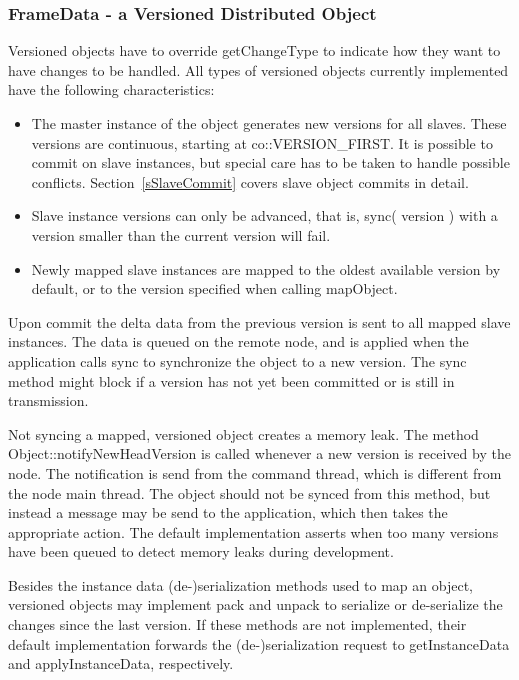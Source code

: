 \documentclass[10pt,a4]{scrartcl}
\newcommand{\sref}[1]{Section~\ref{#1}}
\begin{document}
\subsubsection{FrameData - a Versioned Distributed Object}

Versioned objects have to override \textsf{getChangeType} to indicate
how they want to have changes to be handled. All types of versioned
objects currently implemented have the following characteristics:

\begin{itemize}
\item The master instance of the object generates new versions for all
  slaves. These versions are continuous, starting at
  \textsf{co::VERSION\_FIRST}. It is possible to commit on slave instances, but
  special care has to be taken to handle possible conflicts. \sref{sSlaveCommit}
  covers slave object commits in detail.
\item Slave instance versions can only be advanced, that is, \textsf{sync(
  version )} with a version smaller than the current version will fail.
\item Newly mapped slave instances are mapped to the oldest available
  version by default, or to the version specified when calling
  \textsf{mapObject}.
\end{itemize}

Upon \textsf{commit} the delta data from the previous version is sent to
all mapped slave instances. The data is queued on the remote node, and
is applied when the application calls \textsf{sync} to synchronize the
object to a new version. The \textsf{sync} method might block if a
version has not yet been committed or is still in transmission.

Not syncing a mapped, versioned object creates a memory leak. The method
\textsf{Object::notifyNewHeadVersion} is called whenever a new version
is received by the node. The notification is send from the command
thread, which is different from the node main thread. The object should
not be synced from this method, but instead a message may be send to the
application, which then takes the appropriate action. The default
implementation asserts when too many versions have been queued
to detect memory leaks during development.

Besides the instance data (de-)serialization methods used to map an
object, versioned objects may implement \textsf{pack} and
\textsf{unpack} to serialize or de-serialize the changes since the last
version. If these methods are not implemented, their default
implementation forwards the (de-)serialization request to
\textsf{getInstanceData} and \textsf{applyInstanceData}, respectively.
\end{document}
